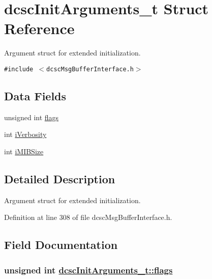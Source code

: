 \hypertarget{structdcscInitArguments__t}{
\section{dcsc\-Init\-Arguments\_\-t Struct Reference}
\label{structdcscInitArguments__t}
}
Argument struct for extended initialization.  


{\tt \#include $<$dcsc\-Msg\-Buffer\-Interface.h$>$}

\subsection*{Data Fields}
\begin{CompactItemize}
\item 
unsigned int \hyperlink{structdcscInitArguments__t_75b86ecc9df1bb76dda0c7ee0fcc4f35}{flags}
\item 
int \hyperlink{structdcscInitArguments__t_5ea3b80cc981315aa7508ba54653b57a}{i\-Verbosity}
\item 
int \hyperlink{structdcscInitArguments__t_5faecf13bfb7cb86647f13a38d37ccac}{i\-MIBSize}
\end{CompactItemize}


\subsection{Detailed Description}
Argument struct for extended initialization. 



Definition at line 308 of file dcsc\-Msg\-Buffer\-Interface.h.

\subsection{Field Documentation}
\hypertarget{structdcscInitArguments__t_75b86ecc9df1bb76dda0c7ee0fcc4f35}{
\subsubsection[flags]{\setlength{\rightskip}{0pt plus 5cm}unsigned int \hyperlink{structdcscInitArguments__t_75b86ecc9df1bb76dda0c7ee0fcc4f35}{dcsc\-Init\-Arguments\_\-t::flags}}}
\label{structdcscInitArguments__t_75b86ecc9df1bb76dda0c7ee0fcc4f35}




